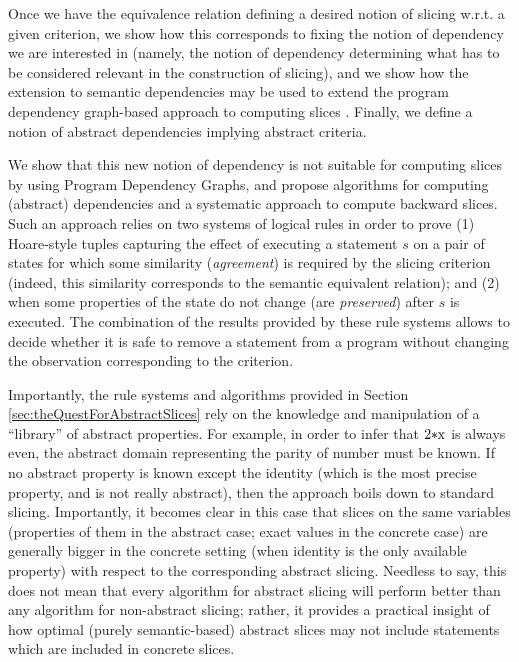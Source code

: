 \documentclass[prodmode,acmtocl]{acmsmall}
\newcommand{\0}{\mbox{\bf 0}}
\newcommand{\CODE}[1]{\ensuremath{\mbox{\lstinline!#1!}\xspace}\xspace}
\begin{document}
Once we have the equivalence relation defining a desired notion of
slicing w.r.t. a given criterion, we show how this corresponds to
fixing the notion of dependency we are interested in (namely, the
notion of dependency determining what has to be considered relevant in
the construction of slicing), and we show how the extension to
semantic dependencies may be used to extend the program dependency
graph-based approach to computing slices \cite{horPR89}.  Finally, we
define a notion of abstract dependencies implying abstract criteria.

We show that this new notion of dependency is not suitable for
computing slices by using Program Dependency Graphs, and propose
algorithms for computing (abstract) dependencies and a systematic
approach to compute backward slices.  Such an approach relies on two
systems of logical rules in order to prove (1) Hoare-style tuples
capturing the effect of executing a statement $s$ on a pair of states
for which some similarity (\emph{agreement}) is required by the
slicing criterion (indeed, this similarity corresponds to the semantic
equivalent relation); and (2) when some properties of the state do not
change (are \emph{preserved}) after $s$ is executed.  The combination
of the results provided by these rule systems allows to decide whether
it is safe to remove a statement from a program without changing the
observation corresponding to the criterion.

Importantly, the rule systems and algorithms provided in Section
\ref{sec:theQuestForAbstractSlices} rely on the knowledge and
manipulation of a ``library'' of abstract properties.  For example, in
order to infer that \CODE{2*x} is always even, the abstract domain
representing the parity of number must be known.  If no abstract
property is known except the identity (which is the most precise
property, and is not really abstract), then the approach boils down to
standard slicing.  Importantly, it becomes clear in this case that
slices on the same variables (properties of them in the abstract case;
exact values in the concrete case) are generally bigger in the
concrete setting (when identity is the only available property) with
respect to the corresponding abstract slicing.  Needless to say, this
does not mean that every algorithm for abstract slicing will perform
better than any algorithm for non-abstract slicing; rather, it
provides a practical insight of how optimal (purely semantic-based)
abstract slices may not include statements which are included in
concrete slices.
\end{document}
